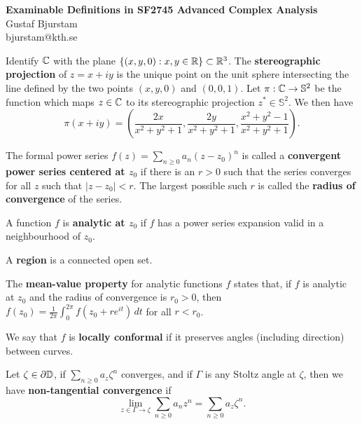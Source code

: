 \documentclass[12pt]{article}
\begin{document}
\begin{center}
\textbf{\large Examinable Definitions in SF2745 Advanced Complex Analysis} \\
Gustaf Bjurstam\\
bjurstam@kth.se\\
\end{center}

\begin{definition}
    Identify $\mathbb{C}$ with the plane $\{(x,y,0):x,y\in\mathbb{R}\}\subset\mathbb{R}^3$. The \textbf{stereographic projection} of $z=x+iy$ is the unique point on the unit sphere intersecting the line defined by the two points $(x,y,0)$ and $(0,0,1)$. Let $\pi:\mathbb{C}\to\mathbb{S}^2$ be the function which maps $z\in\mathbb{C}$ to its stereographic projection $z^*\in\mathbb{S}^2$. We then have
    \begin{equation*}
        \pi(x+iy)=\left(\frac{2x}{x^2+y^2+1},\frac{2y}{x^2+y^2+1},\frac{x^2+y^2-1}{x^2+y^2+1}\right).
    \end{equation*}
\end{definition}
\begin{definition}
    The formal power series $f(z)=\sum_{n\geq0} a_n(z-z_0)^n$ is called a \textbf{convergent power series centered at $z_0$} if there is an $r>0$ such that the series converges for all $z$ such that $|z-z_0|<r$. The largest possible such $r$ is called the \textbf{radius of convergence} of the series.
\end{definition}
\begin{definition}
    A function $f$ is \textbf{analytic at $z_0$} if $f$ has a power series expansion valid in a neighbourhood of $z_0$.
\end{definition}
\begin{definition}
    A \textbf{region} is a connected open set.
\end{definition} 
\begin{definition}
    The \textbf{mean-value property} for analytic functions $f$ states that, if $f$ is analytic at $z_0$ and the radius of convergence is $r_0>0$, then $f(z_0)=\frac{1}{2\pi}\int_0^{2\pi}f(z_0+re^{it})\,dt$ for all $r<r_0$.
\end{definition} 
\begin{definition}
    We say that $f$ is \textbf{locally conformal} if it preserves angles (including direction) between curves.
\end{definition} 
\begin{definition}
    Let $\zeta\in\partial \mathbb{D}$, if $\sum_{n\geq0}a_z\zeta^n$ converges, and if $\Gamma$ is any Stoltz angle at $\zeta$, then we have \textbf{non-tangential convergence} if
    \begin{equation*}
        \lim_{z\in\Gamma\to\zeta} \sum_{n\geq 0} a_nz^n=\sum_{n\geq0}a_z\zeta^n.
    \end{equation*}
\end{definition} 
\end{document}
